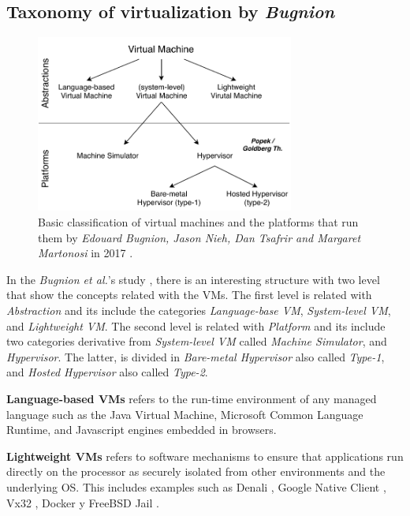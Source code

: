 	\subsection{Taxonomy of virtualization by \textit{Bugnion}}
	
	\begin{figure}[H]
		\centering
		\includegraphics[width=8.5cm]{images/Bugnion2017.pdf}
		\vspace{-0.2cm}
		\caption{Basic classification of virtual machines and the platforms that run them by \textit{Edouard Bugnion, Jason Nieh, Dan Tsafrir and Margaret Martonosi} in 2017 \cite{Bugnion2017}.}
		\label{fig:TaxonomyOfVirtualizationBugnion}
	\end{figure}
	   
    In the \textit{Bugnion et al.}'s study \cite{Bugnion2017}, there is an interesting structure with two level that show the concepts related with the VMs. The first level is related with \textit{Abstraction} and its include the categories \textit{Language-base VM}, \textit{System-level VM}, and \textit{Lightweight VM}. The second level is related with \textit{Platform} and its include two categories derivative from \textit{System-level VM} called \textit{Machine Simulator}, and \textit{Hypervisor}. The latter, is divided in \textit{Bare-metal Hypervisor} also called \textit{Type-1}, and \textit{Hosted Hypervisor} also called \textit{Type-2}.
    
    \textbf{Language-based VMs} refers to the run-time environment of any managed language such as the Java Virtual Machine, Microsoft Common Language Runtime, and Javascript engines embedded in browsers.  
    
    \textbf{Lightweight VMs} refers to software mechanisms to ensure that applications run directly on the processor as securely isolated from other environments and the underlying OS. This includes examples such as Denali \cite {Whitaker2002}, Google Native Client \cite{Yee2009}, Vx32 \cite{Ford2008}, Docker \cite{Docker} y FreeBSD Jail \cite{Kamp2000}.
    
